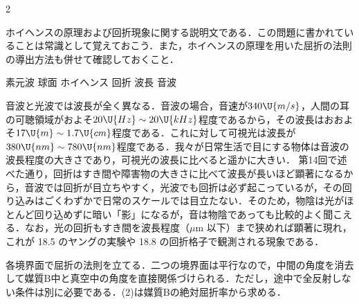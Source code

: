 \begin{multicols}{2}
\par\nopagebreak
\begin{sisin}
ホイヘンスの原理および回折現象に関する説明文である．この問題に書かれていることは常識として覚えておこう．また，ホイヘンスの原理を用いた屈折の法則の導出方法も併せて確認しておくこと．
\end{sisin}
\KaiHead
\begin{komon}
 素元波
 球面
 ホイヘンス
 回折
 波長
 音波
\end{komon}
\begin{chuu}
音波と光波では波長が全く異なる．音波の場合，音速が$340\U{m/s}$，人間の耳の可聴領域がおよそ$20\U{Hz}\sim 20\U{kHz}$程度であるから，その波長はおおよそ$17\U{m}\sim 1.7\U{cm}$程度である．これに対して可視光は波長が$380\U{nm}\sim 780\U{nm}$程度である．我々が日常生活で目にする物体は音波の波長程度の大きさであり，可視光の波長に比べると遥かに大きい．
第14回で述べた通り，回折はすき間や障害物の大きさに比べて波長が長いほど顕著になるから，音波では回折が目立ちやすく，{\gtfamily 光波でも回折は必ず起こっているが，その回り込みはごくわずかで日常のスケールでは目立たない}．そのため，物陰は光がほとんど回り込めずに暗い「影」になるが，音は物陰であっても比較的よく聞こえる．なお，光の回折もすき間を波長程度（$\mu$m 以下）まで狭めれば顕著に現れ，これが 18.5 のヤングの実験や 18.8 の回折格子で観測される現象である．
\end{chuu}

\par\nopagebreak
\begin{sisin}
各境界面で屈折の法則を立てる．二つの境界面は平行なので，中間の角度を消去して媒質$\mathrm{B}$中と真空中の角度を直接関係づけられる．ただし，途中で全反射しない条件は別に必要である．(2)は媒質$\mathrm{B}$の絶対屈折率から求める．


\end{sisin}
\end{multicols}
